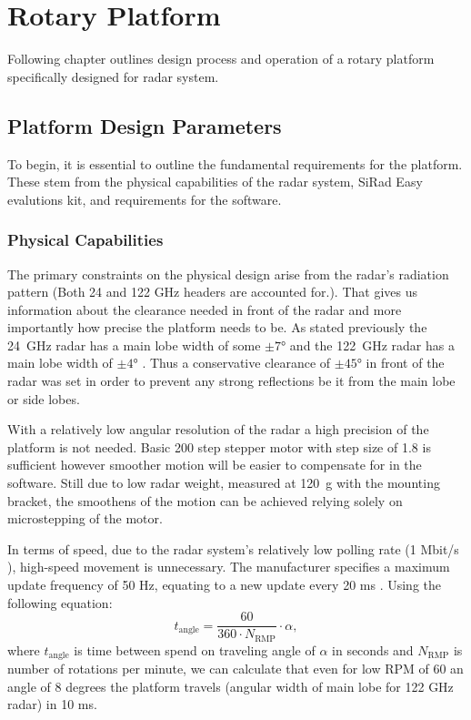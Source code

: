 \chapter{Rotary Platform}

Following chapter outlines design process and operation of a rotary platform specifically designed for \sidar radar system.

\section{Platform Design Parameters}


To begin, it is essential to outline the fundamental requirements for the platform.
These stem from the physical capabilities of the radar system, SiRad Easy evalutions kit, and requirements for the software.

\subsection{Physical Capabilities}

The primary constraints on the physical design arise from the radar's radiation pattern (Both 24 and 122 GHz headers are accounted for.).
That gives us information about the clearance needed in front of the radar and more importantly how precise the platform needs to be.
As stated previously the 24~GHz radar has a main lobe width of some $\pm7\text{°}$ and the 122~GHz radar has a main lobe width of $\pm4\text{°}$ \cite{sidarTRX122}.
Thus a conservative clearance of $\pm45\text{°}$ in front of the radar was set in order to prevent any strong reflections be it from the main lobe or side lobes.

With a relatively low angular resolution of the radar a high precision of the platform is not needed.
Basic 200 step stepper motor with step size of 1.8 is sufficient however smoother motion will be easier to compensate for in the software.
Still due to low radar weight, measured at 120~g with the mounting bracket, the smoothens of the motion can be achieved relying solely on microstepping of the motor.

In terms of speed, due to the radar system's relatively low polling rate (1 Mbit/s \cite{sidarMAN}), high-speed movement is unnecessary. The manufacturer specifies a maximum update frequency of 50 Hz, equating to a new update every 20 ms \cite{sidarMAN}.
Using the following equation:
%
\begin{equation}
  t_{\mathrm{angle}} = \frac{60}{360\cdot N_{\mathrm{RMP}}} \cdot  \alpha,
  \label{eq:poll}
\end{equation}
%
where $t_{\mathrm{angle}}$ is time between spend on traveling angle of $\alpha $ in seconds and $N_{\mathrm{RMP}}$ is number of rotations per minute, we can calculate that even for low RPM of 60 an angle of 8 degrees the platform travels (angular width of main lobe for 122 GHz radar) in 10 ms.

